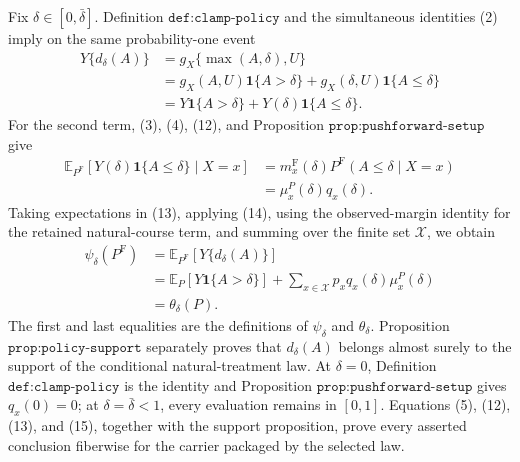 Fix \(\delta\in[0,\bar\delta]\). Definition \(\texttt{def:clamp-policy}\) and the simultaneous identities (2) imply on the same probability-one event
\[
\begin{aligned}
 Y\{d_\delta(A)\}
 &=g_X\{\max(A,\delta),U\}\\
 &=g_X(A,U)\mathbf 1\{A>\delta\}
   +g_X(\delta,U)\mathbf 1\{A\leq\delta\}\\
 &=Y\mathbf 1\{A>\delta\}
   +Y(\delta)\mathbf 1\{A\leq\delta\}.
\end{aligned}
\tag{13}
\]
For the second term, (3), (4), (12), and Proposition \(\texttt{prop:pushforward-setup}\) give
\[
\begin{aligned}
 \mathbb E_{P^{\mathrm F}}[Y(\delta)\mathbf 1\{A\leq\delta\}\mid X=x]
 &=m_x^{\mathrm F}(\delta)
   P^{\mathrm F}(A\leq\delta\mid X=x)\\
 &=\mu_x^P(\delta)q_x(\delta).
\end{aligned}
\tag{14}
\]
Taking expectations in (13), applying (14), using the observed-margin identity for the retained natural-course term, and summing over the finite set \(\mathcal X\), we obtain
\[
\begin{aligned}
 \psi_\delta(P^{\mathrm F})
 &=\mathbb E_{P^{\mathrm F}}[Y\{d_\delta(A)\}]\\
 &=\mathbb E_P[Y\mathbf 1\{A>\delta\}]
   +\sum_{x\in\mathcal X}p_xq_x(\delta)\mu_x^P(\delta)\\
 &=\theta_\delta(P).
\end{aligned}
\tag{15}
\]
The first and last equalities are the definitions of \(\psi_\delta\) and \(\theta_\delta\). Proposition \(\texttt{prop:policy-support}\) separately proves that \(d_\delta(A)\) belongs almost surely to the support of the conditional natural-treatment law. At \(\delta=0\), Definition \(\texttt{def:clamp-policy}\) is the identity and Proposition \(\texttt{prop:pushforward-setup}\) gives \(q_x(0)=0\); at \(\delta=\bar\delta<1\), every evaluation remains in \([0,1]\). Equations (5), (12), (13), and (15), together with the support proposition, prove every asserted conclusion fiberwise for the carrier packaged by the selected law.